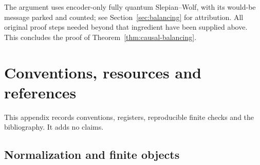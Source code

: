 \documentclass[11pt,a4paper]{article}
\numberwithin{equation}{section}
\theoremstyle{plain}
\theoremstyle{definition}
\begin{document}
The argument uses encoder-only fully quantum Slepian--Wolf, with its would-be
message parked and counted; see Section~\ref{sec:balancing} for attribution.
All original proof steps needed beyond that ingredient have been supplied
above. This concludes the proof of Theorem~\ref{thm:causal-balancing}.


\section{Conventions, resources and references}
\label{app:conventions}

This appendix records conventions, registers, reproducible finite checks and
the bibliography. It adds no claims.

\subsection{Normalization and finite objects}
\end{document}

